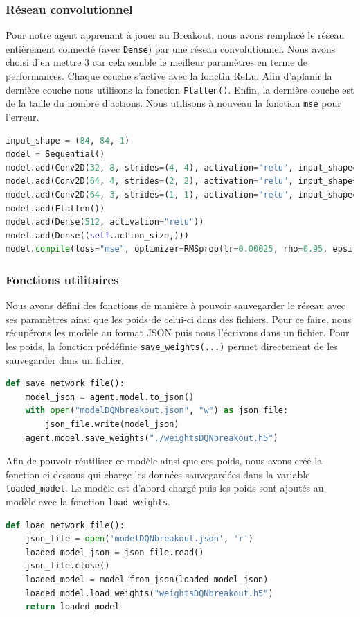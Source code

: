 \documentclass[10pt,a4paper]{article}
\begin{document}
\subsubsection{Réseau convolutionnel}

Pour notre agent apprenant à jouer au Breakout, nous avons remplacé le réseau entièrement connecté (avec \lstinline{Dense}) par une réseau convolutionnel. Nous avons choisi d'en mettre 3 car cela semble le meilleur paramètres en terme de performances. Chaque couche s'active avec la fonctin ReLu. Afin d'aplanir la dernière couche nous utilisons la fonction \lstinline{Flatten()}. Enfin, la dernière couche est de la taille du nombre d'actions. Nous utilisons à nouveau la fonction \lstinline{mse} pour l'erreur.

\begin{lstlisting}[language=Python, caption=Réseau convolutionnel de l'agent Breakout]
input_shape = (84, 84, 1)
model = Sequential()
model.add(Conv2D(32, 8, strides=(4, 4), activation="relu", input_shape=input_shape))
model.add(Conv2D(64, 4, strides=(2, 2), activation="relu", input_shape=input_shape))
model.add(Conv2D(64, 3, strides=(1, 1), activation="relu", input_shape=input_shape))
model.add(Flatten())
model.add(Dense(512, activation="relu"))
model.add(Dense((self.action_size,)))
model.compile(loss="mse", optimizer=RMSprop(lr=0.00025, rho=0.95, epsilon=0.01), metrics=["accuracy"])
\end{lstlisting}

\subsubsection{Fonctions utilitaires}

Nous avons défini des fonctions de manière à pouvoir sauvegarder le réseau avec ses paramètres ainsi que les poids de celui-ci dans des fichiers. Pour ce faire, nous récupérons les modèle au format JSON puis nous l'écrivons dans un fichier. Pour les poids, la fonction prédéfinie \lstinline{save_weights(...)} permet directement de les sauvegarder dans un fichier.
\begin{lstlisting}[language=Python, caption=Sauvegarde du réseau neuronal et de ses poids]
def save_network_file():
    model_json = agent.model.to_json()
    with open("modelDQNbreakout.json", "w") as json_file:
        json_file.write(model_json)
    agent.model.save_weights("./weightsDQNbreakout.h5")
\end{lstlisting}

Afin de pouvoir réutiliser ce modèle ainsi que ces poids, nous avons créé la fonction ci-dessous qui charge les données sauvegardées dans la variable \lstinline{loaded_model}. Le modèle est d'abord chargé puis les poids sont ajoutés au modèle avec la fonction \lstinline{load_weights}.
\begin{lstlisting}[language=Python, caption=Chargement du réseau neuronal et de ses poids]
def load_network_file():
    json_file = open('modelDQNbreakout.json', 'r')
    loaded_model_json = json_file.read()
    json_file.close()
    loaded_model = model_from_json(loaded_model_json)
    loaded_model.load_weights("weightsDQNbreakout.h5")
    return loaded_model
\end{lstlisting}
\end{document}
